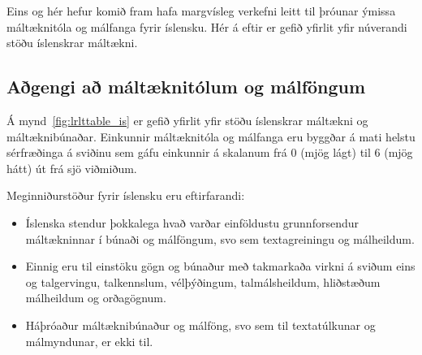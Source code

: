 \begin{multicols}{2}
Eins og hér hefur komið fram hafa margvísleg verkefni leitt til þróunar ýmissa máltæknitóla og málfanga fyrir íslensku. Hér á eftir er gefið yfirlit yfir núverandi stöðu íslenskrar máltækni.

\subsection{Aðgengi að máltæknitólum og málföngum}

Á mynd~\ref{fig:lrlttable_is} er gefið yfirlit yfir stöðu íslenskrar máltækni og máltæknibúnaðar. Einkunnir máltæknitóla og málfanga eru byggðar á mati helstu sérfræðinga á sviðinu sem gáfu einkunnir á skalanum frá 0 (mjög lágt) til 6 (mjög hátt) út frá sjö viðmiðum.

Meginniðurstöður fyrir íslensku eru eftirfarandi:

\begin{itemize}
\item Íslenska stendur þokkalega hvað varðar einföldustu grunnforsendur máltækninnar í búnaði og málföngum, svo sem textagreiningu og málheildum.
\item Einnig eru til einstöku gögn og búnaður með takmarkaða virkni á sviðum eins og talgervingu, talkennslum, vélþýðingum, talmálsheildum, hliðstæðum málheildum og orðagögnum. 
\item Háþróaður máltæknibúnaður og málföng, svo sem til textatúlkunar og málmyndunar, er ekki til. 
\end{itemize}


\end{multicols}
